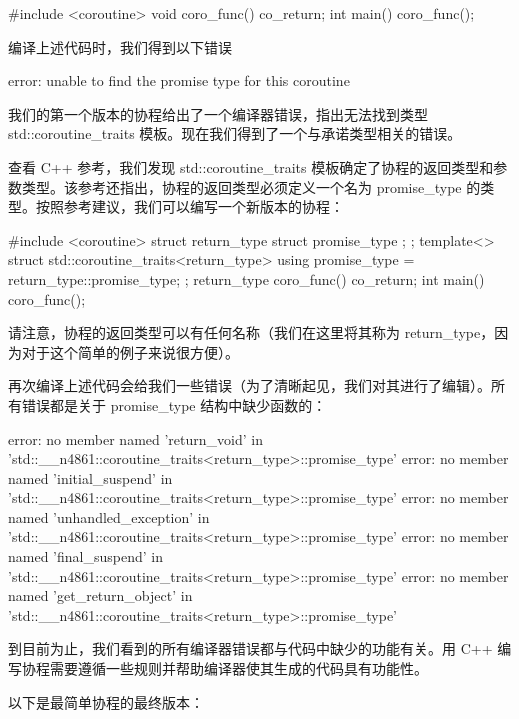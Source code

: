 \begin{cpp}
#include <coroutine>
void coro_func() {
    co_return;
}
int main() {
    coro_func();
}
\end{cpp}

编译上述代码时，我们得到以下错误

\begin{shell}
error: unable to find the promise type for this coroutine
\end{shell}

我们的第一个版本的协程给出了一个编译器错误，指出无法找到类型 std::coroutine\_traits 模板。现在我们得到了一个与承诺类型相关的错误。

查看 C++ 参考，我们发现 std::coroutine\_traits 模板确定了协程的返回类型和参数类型。该参考还指出，协程的返回类型必须定义一个名为 promise\_type 的类型。按照参考建议，我们可以编写一个新版本的协程：

\begin{cpp}
#include <coroutine>
struct return_type {
    struct promise_type {
    };
};
template<>
struct std::coroutine_traits<return_type> {
    using promise_type = return_type::promise_type;
};
return_type coro_func() {
    co_return;
}
int main() {
    coro_func();
}
\end{cpp}

请注意，协程的返回类型可以有任何名称（我们在这里将其称为 return\_type，因为对于这个简单的例子来说很方便）。

再次编译上述代码会给我们一些错误（为了清晰起见，我们对其进行了编辑）。所有错误都是关于 promise\_type 结构中缺少函数的：

\begin{shell}
error: no member named 'return_void' in 'std::__n4861::coroutine_traits<return_type>::promise_type'
error: no member named 'initial_suspend' in 'std::__n4861::coroutine_traits<return_type>::promise_type'
error: no member named 'unhandled_exception' in 'std::__n4861::coroutine_traits<return_type>::promise_type'
error: no member named 'final_suspend' in 'std::__n4861::coroutine_traits<return_type>::promise_type'
error: no member named 'get_return_object' in 'std::__n4861::coroutine_traits<return_type>::promise_type'
\end{shell}

到目前为止，我们看到的所有编译器错误都与代码中缺少的功能有关。用 C++ 编写协程需要遵循一些规则并帮助编译器使其生成的代码具有功能性。

以下是最简单协程的最终版本：

